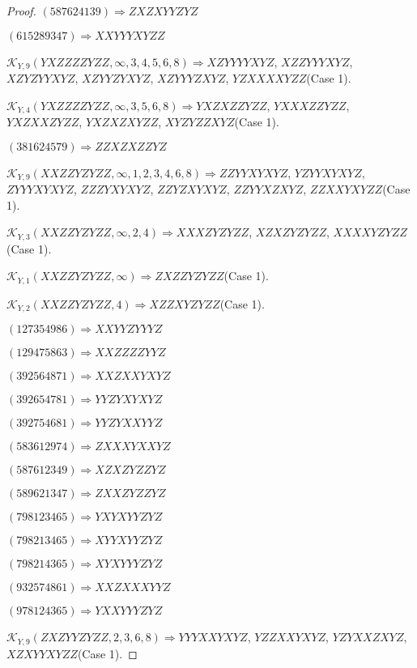 \documentclass[12pt]{article}
\theoremstyle{plain}
\theoremstyle{definition}
\theoremstyle{remark}
\newcommand{\fancy}[1]{\mathcal{#1}}
\def\K{\fancy{K}}
\begin{document}
\begin{proof}
	$(5 8 7 6 2 4 1 3 9)\Rightarrow ZXZXYYZYZ$
	
	$(6 1 5 2 8 9 3 4 7)\Rightarrow XXYYYXYZZ$
	
	
	
	$\K_{Y,9}(YXZZZZYZZ,\infty,3, 4, 5, 6, 8)\Rightarrow $$XZYYYYXYZ$, $XZZYYYXYZ$, $XZYZYYXYZ$, $XZYYZYXYZ$, $XZYYYZXYZ$, $YZXXXXYZZ$(Case 1).
	
	$\K_{Y,4}(YXZZZZYZZ,\infty,3, 5, 6, 8)\Rightarrow $$YXZXZZYZZ$, $YXXXZZYZZ$, $YXZXXZYZZ$, $YXZXZXYZZ$, $XYZYZZXYZ$(Case 1).
	
	
	
	$(3 8 1 6 2 4 5 7 9)\Rightarrow ZZXZXZZYZ$
	
	
	
	$\K_{Y,9}(XXZZYZYZZ,\infty,1, 2, 3, 4, 6, 8)\Rightarrow $$ZZYYXYXYZ$, $YZYYXYXYZ$, $ZYYYXYXYZ$, $ZZZYXYXYZ$, $ZZYZXYXYZ$, $ZZYYXZXYZ$, $ZZXXYXYZZ$(Case 1).
	
	$\K_{Y,3}(XXZZYZYZZ,\infty,2, 4)\Rightarrow $$XXXZYZYZZ$, $XZXZYZYZZ$, $XXXXYZYZZ$(Case 1).
	
	$\K_{Y,1}(XXZZYZYZZ,\infty)\Rightarrow $$ZXZZYZYZZ$(Case 1).
	
	$\K_{Y,2}(XXZZYZYZZ,4)\Rightarrow $$XZZXYZYZZ$(Case 1).
	
	
	
	$(1 2 7 3 5 4 9 8 6)\Rightarrow XXYYZYYYZ$
	
	$(1 2 9 4 7 5 8 6 3)\Rightarrow XXZZZZYYZ$
	
	$(3 9 2 5 6 4 8 7 1)\Rightarrow XXZXXYXYZ$
	
	$(3 9 2 6 5 4 7 8 1)\Rightarrow YYZYXYXYZ$
	
	$(3 9 2 7 5 4 6 8 1)\Rightarrow YYZYXXYYZ$
	
	$(5 8 3 6 1 2 9 7 4)\Rightarrow ZXXXYXXYZ$
	
	$(5 8 7 6 1 2 3 4 9)\Rightarrow XZXZYZZYZ$
	
	$(5 8 9 6 2 1 3 4 7)\Rightarrow ZXXZYZZYZ$
	
	$(7 9 8 1 2 3 4 6 5)\Rightarrow YXYXYYZYZ$
	
	$(7 9 8 2 1 3 4 6 5)\Rightarrow XYYXYYZYZ$
	
	$(7 9 8 2 1 4 3 6 5)\Rightarrow XYXYYYZYZ$
	
	$(9 3 2 5 7 4 8 6 1)\Rightarrow XXZXXXYYZ$
	
	$(9 7 8 1 2 4 3 6 5)\Rightarrow YXXYYYZYZ$
	
	
	
	$\K_{Y,9}(ZXZYYZYZZ,2, 3, 6, 8)\Rightarrow $$YYYXXYXYZ$, $YZZXXYXYZ$, $YZYXXZXYZ$, $XZXYYXYZZ$(Case 1).
	

\end{proof}
\end{document}
